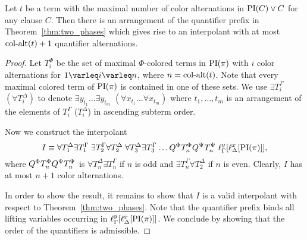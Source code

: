 \begin{lemma}
	\label{lemma:quant_alt_upper_bound}
	Let $t$ be a term with the maximal number of color alternations in $\operatorname{PI}(C) \lor C$ for any clause $C$.
	Then there is an arrangement of the quantifier prefix in Theorem~\ref{thm:two_phases} which gives rise to an interpolant 
	with at most $\ca(t)+\nolinebreak{}1$ quantifier alternations.
\end{lemma}
\begin{proof}
	Let $T_i^\Phi$ be the set of maximal $\Phi$-colored terms in $\operatorname{PI}(\pi)$ with $i$ color alternations for $1\varleq i \varleq n$, where $n=\operatorname{col-alt}(t)$.
	Note that every maximal colored term of $\operatorname{PI}(\pi)$ is contained in one of these sets.
	We use $\exists T_i^\Gamma$ $(\forall T_i^\Delta)$ to denote $ \exists y_{t_1} \dots \exists y_{t_m}$ $(\forall x_{t_1}\dots\forall x_{t_m})$ where $t_1, \dots, t_m$ is an arrangement of the elements of $T_i^\Gamma$ ($T_i^\Delta$) in ascending subterm order. 


	Now we construct the interpolant
	\[
		I \equiv 
		\forall T_1^\Delta \exists T_1^\Gamma \;
		\exists T_2^\Gamma \forall T_2^\Delta \;
		\forall T_3^\Delta \exists T_3^\Gamma
		\dots 
		Q^\Phi T_n^\Phi Q^\Psi T_n^\Psi
		\;
		\ell_{\Gamma}^{y}[\ell_{\Delta}^{x}[\operatorname{PI}(\pi)]],
	\]
	where $ Q^\Phi T_n^\Phi Q^\Psi T_n^\Psi $ is
	$\forall T_n^\Delta \exists T_n^\Gamma $ if $n$ is odd and 
	$\exists T_n^\Gamma \forall T_2^\Delta $ if $n$ is even.
	Clearly, $I$ has at most $n+1$ color alternations.

	In order to show the result, it remains to show that $I$ is a valid interpolant with respect to Theorem~\ref{thm:two_phases}. 
	Note that the quantifier prefix binds all lifting variables occurring in  
	$\ell_{\Gamma}^{y}[\ell_{\Delta}^{x}[\operatorname{PI}(\pi)]]$.
	We conclude by showing that the order of the quantifiers is admissible.


\end{proof}
